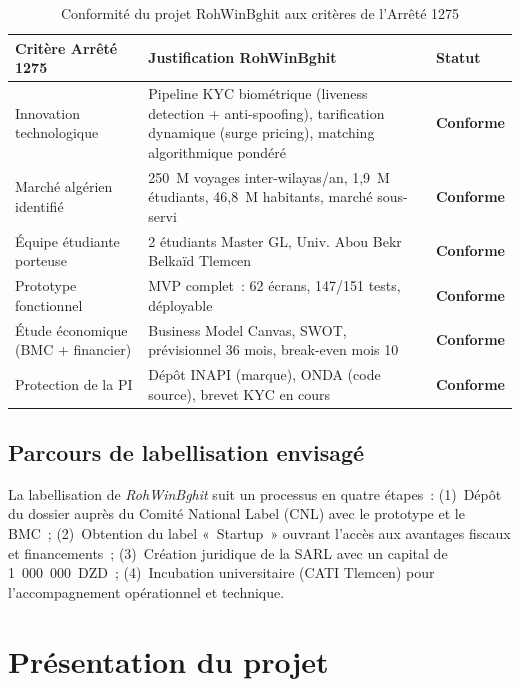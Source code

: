 \begin{table}[H]
\centering
\footnotesize
\renewcommand{\arraystretch}{1.3}
\begin{tabularx}{\textwidth}{|p{4cm}|X|p{2.5cm}|}
\hline
\rowcolor{rohlight}
\textbf{Critère Arrêté 1275} & \textbf{Justification RohWinBghit} & \textbf{Statut} \\
\hline
Innovation technologique & Pipeline KYC biométrique (liveness detection + anti-spoofing), tarification dynamique (surge pricing), matching algorithmique pondéré & \textcolor{green!60!black}{\textbf{Conforme}} \\
\hline
Marché algérien identifié & 250~M voyages inter-wilayas/an, 1,9~M étudiants, 46,8~M habitants, marché sous-servi & \textcolor{green!60!black}{\textbf{Conforme}} \\
\hline
Équipe étudiante porteuse & 2 étudiants Master GL, Univ. Abou Bekr Belkaïd Tlemcen & \textcolor{green!60!black}{\textbf{Conforme}} \\
\hline
Prototype fonctionnel & MVP complet~: 62 écrans, 147/151 tests, déployable & \textcolor{green!60!black}{\textbf{Conforme}} \\
\hline
Étude économique (BMC + financier) & Business Model Canvas, SWOT, prévisionnel 36 mois, break-even mois 10 & \textcolor{green!60!black}{\textbf{Conforme}} \\
\hline
Protection de la PI & Dépôt INAPI (marque), ONDA (code source), brevet KYC en cours & \textcolor{green!60!black}{\textbf{Conforme}} \\
\hline
\end{tabularx}
  \caption{Conformité du projet RohWinBghit aux critères de l'Arrêté 1275}
  \label{tab:arrete1275}
\end{table}

\subsection{Parcours de labellisation envisagé}

La labellisation de \textit{RohWinBghit} suit un processus en quatre étapes~: (1)~Dépôt du dossier auprès du Comité National Label (CNL) avec le prototype et le BMC~; (2)~Obtention du label «~Startup~» ouvrant l'accès aux avantages fiscaux et financements~; (3)~Création juridique de la SARL avec un capital de 1~000~000~DZD~; (4)~Incubation universitaire (CATI Tlemcen) pour l'accompagnement opérationnel et technique.

\section{Présentation du projet}

